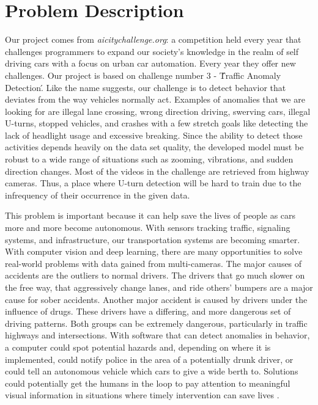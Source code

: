 \documentclass[10pt,twocolumn,letterpaper]{article}
\begin{document}
\section{Problem Description}
Our project comes from \textit{aicitychallenge.org}: a competition held every year that challenges programmers to expand our society's knowledge in the realm of self driving cars with a focus on urban car automation. Every year they offer new challenges. Our project is based on challenge number $3$ - \'Traffic Anomaly Detection\'. Like the name suggests, our challenge is to detect behavior that deviates from the way vehicles normally act. Examples of anomalies that we are looking for are illegal lane crossing, wrong direction driving, swerving cars, illegal U-turns, stopped vehicles, and crashes with a few stretch goals like detecting the lack of headlight usage and excessive breaking. Since the ability to detect those activities depends heavily on the data set quality, the developed model must be robust to a wide range of situations such as zooming, vibrations, and sudden direction changes. Most of the videos in the challenge are retrieved from highway cameras. Thus, a place where U-turn detection will be hard to train due to the infrequency of their occurrence in the given data.

This problem is important because it can help save the lives of people as cars more and more become autonomous. With sensors tracking traffic, signaling systems, and infrastructure, our transportation systems are becoming smarter. With computer vision and deep learning, there are many opportunities to solve real-world problems with data gained from multi-cameras. The major causes of accidents are the outliers to normal drivers. The drivers that go much slower on the free way, that aggressively change lanes, and ride others' bumpers are a major cause for sober accidents. Another major accident is caused by drivers under the influence of drugs. These drivers have a differing, and more dangerous set of driving patterns. Both groups can be extremely dangerous, particularly in traffic highways and intersections. With software that can detect anomalies in behavior, a computer could spot potential hazards and, depending on where it is implemented, could notify police in the area of a potentially drunk driver, or could tell an autonomous vehicle which cars to give a wide berth to. Solutions could potentially get the humans in the loop to pay attention to meaningful visual information in situations where timely intervention can save lives \cite{naphade2017nvidia}.
\end{document}

